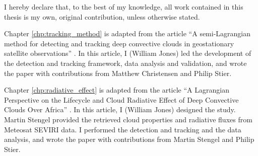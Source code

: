 \begin{originality}

I hereby declare that, to the best of my knowledge, all work contained in this thesis is my own, original contribution, unless otherwise stated.

Chapter \ref{chp:tracking_method} is adapted from the article ``A semi-Lagrangian method for detecting and tracking deep convective clouds in geostationary satellite observations'' \citep{jones_semi-lagrangian_2023}. In this article, I (William Jones) led the development of the detection and tracking framework, data analysis and validation, and wrote the paper with contributions from Matthew Christensen and Philip Stier.

Chapter \ref{chp:radiative_effect} is adapted from the article ``A Lagrangian Perspective on the Lifecycle and Cloud Radiative Effect of Deep Convective Clouds Over Africa'' \citep[][accepted]{jones_lagrangian_2023}. In this article, I (William Jones) designed the study. Martin Stengel provided the retrieved cloud properties and radiative fluxes from Meteosat SEVIRI data. I performed the detection and tracking and the data analysis, and wrote the paper with contributions from Martin Stengel and Philip Stier.

\end{originality}

